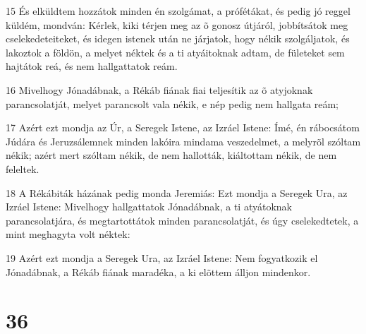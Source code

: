 \par 15 És elküldtem hozzátok minden én szolgámat, a prófétákat, és pedig jó reggel küldém, mondván: Kérlek, kiki térjen meg az õ gonosz útjáról, jobbítsátok meg cselekedeteiteket, és idegen istenek után ne járjatok, hogy nékik szolgáljatok, és lakoztok a földön, a melyet néktek és a ti atyáitoknak adtam, de fületeket sem hajtátok reá, és nem hallgattatok reám.
\par 16 Mivelhogy Jónadábnak, a Rékáb fiának fiai teljesítik az õ atyjoknak parancsolatját, melyet parancsolt vala nékik, e nép pedig nem hallgata reám;
\par 17 Azért ezt mondja az Úr, a Seregek Istene, az Izráel Istene: Ímé, én rábocsátom Júdára és Jeruzsálemnek minden lakóira mindama veszedelmet, a melyrõl szóltam nékik; azért mert szóltam nékik, de nem hallották, kiáltottam nékik, de nem feleltek.
\par 18 A Rékábiták házának pedig monda Jeremiás: Ezt mondja a Seregek Ura, az Izráel Istene: Mivelhogy hallgattatok Jónadábnak, a ti atyátoknak parancsolatjára, és megtartottátok minden parancsolatját, és úgy cselekedtetek, a mint meghagyta volt néktek:
\par 19 Azért ezt mondja a Seregek Ura, az Izráel Istene: Nem fogyatkozik el Jónadábnak, a Rékáb fiának maradéka, a ki elõttem álljon mindenkor.

\chapter{36}

